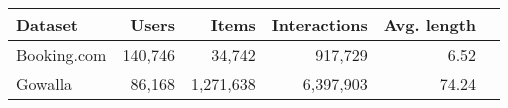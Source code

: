
    \begin{tabular}{lrrrrr}
    \toprule
    Dataset &  Users &  Items &  Interactions &  {Avg. length} \\
    \midrule
    Booking.com &   140,746 &      34,742 &           917,729 &            6.52 \\
    Gowalla  &      86,168 &    1,271,638 &           6,397,903 &            74.24 \\
    \bottomrule
    \end{tabular}
